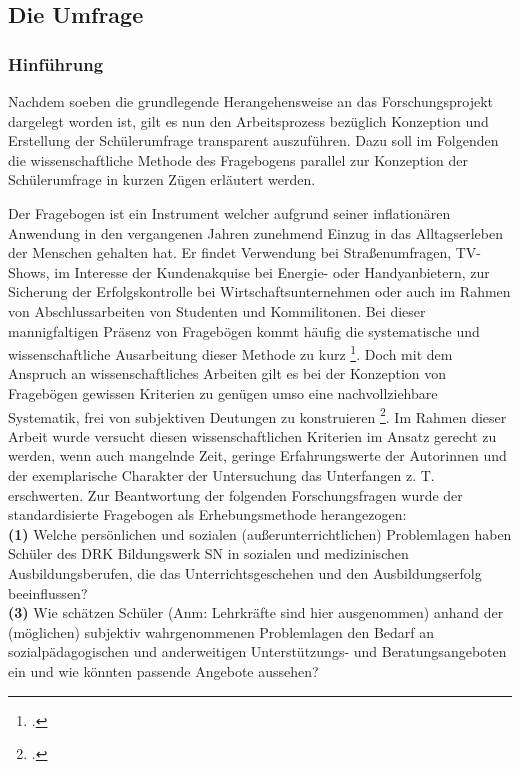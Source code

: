 \subsection{Die Umfrage}
\label{sec:DieUmfrage}

\subsubsection{Hinführung}
\label{sec:Hinführung}

Nachdem soeben die grundlegende Herangehensweise an das Forschungsprojekt dargelegt worden ist, gilt es nun den Arbeitsprozess bezüglich Konzeption und Erstellung der Schülerumfrage transparent auszuführen. Dazu soll im Folgenden die wissenschaftliche Methode des Fragebogens parallel zur Konzeption der Schülerumfrage in kurzen Zügen erläutert werden.

Der Fragebogen ist ein Instrument welcher aufgrund seiner inflationären Anwendung in den vergangenen Jahren zunehmend Einzug in das Alltagserleben der Menschen gehalten hat. Er findet Verwendung bei Straßenumfragen, TV-Shows, im Interesse der Kundenakquise bei Energie- oder Handyanbietern, zur Sicherung der Erfolgskontrolle bei Wirtschaftsunternehmen oder auch im Rahmen von Abschlussarbeiten von Studenten und Kommilitonen. Bei dieser mannigfaltigen Präsenz von Fragebögen kommt häufig die systematische und wissenschaftliche Ausarbeitung dieser Methode zu kurz \footcite[vgl.][11]{Kallus2010}. Doch mit dem Anspruch an wissenschaftliches Arbeiten gilt es bei der Konzeption von Fragebögen gewissen Kriterien zu genügen umso eine nachvollziehbare Systematik, frei von subjektiven Deutungen zu konstruieren \footcite[vgl.][9]{Mayer2013}. Im Rahmen dieser Arbeit wurde versucht diesen wissenschaftlichen Kriterien im Ansatz gerecht zu werden, wenn auch mangelnde Zeit, geringe Erfahrungswerte der Autorinnen und der exemplarische Charakter der Untersuchung das Unterfangen z. T. erschwerten. Zur Beantwortung der folgenden Forschungsfragen wurde der standardisierte Fragebogen als Erhebungsmethode herangezogen:\\
 
\noindent
\textbf{(1)} Welche persönlichen und sozialen (außerunterrichtlichen) Problemlagen haben Schüler des DRK Bildungswerk SN in sozialen und medizinischen Ausbildungsberufen, die das Unterrichtsgeschehen und den Ausbildungserfolg beeinflussen?\\

\noindent
\textbf{(3)} Wie schätzen Schüler (Anm: Lehrkräfte sind hier ausgenommen) anhand der (möglichen) subjektiv wahrgenommenen Problemlagen den Bedarf an sozialpädagogischen und anderweitigen Unterstützungs- und Beratungsangeboten ein und wie könnten passende Angebote aussehen?\\

